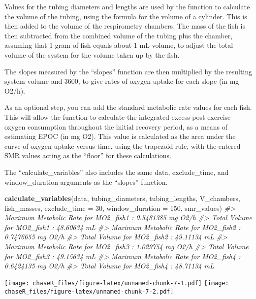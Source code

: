 \documentclass[
]{article}
\newenvironment{Shaded}{\begin{snugshade}}{\end{snugshade}}
\newcommand{\AttributeTok}[1]{\textcolor[rgb]{0.13,0.29,0.53}{#1}}
\newcommand{\CommentTok}[1]{\textcolor[rgb]{0.56,0.35,0.01}{\textit{#1}}}
\newcommand{\DecValTok}[1]{\textcolor[rgb]{0.00,0.00,0.81}{#1}}
\newcommand{\FunctionTok}[1]{\textcolor[rgb]{0.13,0.29,0.53}{\textbf{#1}}}
\newcommand{\NormalTok}[1]{#1}
\begin{document}
Values for the tubing diameters and lengths are used by the function to
calculate the volume of the tubing, using the formula for the volume of
a cylinder. This is then added to the volume of the respirometry
chambers. The mass of the fish is then subtracted from the combined
volume of the tubing plus the chamber, assuming that 1 gram of fish
equals about 1 mL volume, to adjust the total volume of the system for
the volume taken up by the fish.

The slopes measured by the ``slopes'' function are then multiplied by
the resulting system volume and 3600, to give rates of oxygen uptake for
each slope (in mg O2/h).

As an optional step, you can add the standard metabolic rate values for
each fish. This will allow the function to calculate the integrated
excess-post exercise oxygen consumption throughout the initial recovery
period, as a means of estimating EPOC (in mg O2). This value is
calculated as the area under the curve of oxygen uptake versus time,
using the trapezoid rule, with the entered SMR values acting as the
``floor'' for these calculations.

The ``calculate\_variables'' also includes the same data, exclude\_time,
and window\_duration arguments as the ``slopes'' function.

\begin{Shaded}
\begin{Highlighting}[]
\FunctionTok{calculate\_variables}\NormalTok{(data, tubing\_diameters, tubing\_lengths, V\_chambers, fish\_masses, }\AttributeTok{exclude\_time =} \DecValTok{30}\NormalTok{, }\AttributeTok{window\_duration =} \DecValTok{150}\NormalTok{, smr\_values)}
\CommentTok{\#\textgreater{} Maximum Metabolic Rate for MO2\_fish1 : 0.5481385 mg O2/h}
\CommentTok{\#\textgreater{} Total Volume for MO2\_fish1 : 48.60634 mL}
\CommentTok{\#\textgreater{} Maximum Metabolic Rate for MO2\_fish2 : 0.7476655 mg O2/h}
\CommentTok{\#\textgreater{} Total Volume for MO2\_fish2 : 49.11134 mL}
\CommentTok{\#\textgreater{} Maximum Metabolic Rate for MO2\_fish3 : 1.029754 mg O2/h}
\CommentTok{\#\textgreater{} Total Volume for MO2\_fish3 : 49.15634 mL}
\CommentTok{\#\textgreater{} Maximum Metabolic Rate for MO2\_fish4 : 0.6424135 mg O2/h}
\CommentTok{\#\textgreater{} Total Volume for MO2\_fish4 : 48.71134 mL}
\end{Highlighting}
\end{Shaded}

\texttt{[image: chaseR\_files/figure-latex/unnamed-chunk-7-1.pdf]}
\texttt{[image: chaseR\_files/figure-latex/unnamed-chunk-7-2.pdf]}
\end{document}
